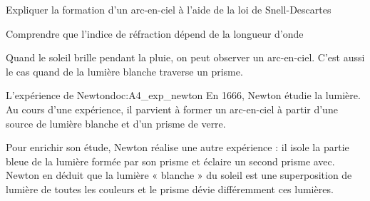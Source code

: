 \teteSndLumi
\vspace*{-40pt}



\vspace*{-12pt}
\begin{objectifs}
  \item Expliquer la formation d'un arc-en-ciel à l'aide de la loi de Snell-Descartes
  \item Comprendre que l'indice de réfraction dépend de la longueur d'onde
\end{objectifs}

\begin{contexte}
  Quand le soleil brille pendant la pluie, on peut observer un arc-en-ciel.
  C'est aussi le cas quand de la lumière blanche traverse un prisme.
  
\end{contexte}


\begin{doc}{L'expérience de Newton}{doc:A4_exp_newton}
  En 1666, Newton étudie la lumière.
  Au cours d'une expérience, il parvient à former un arc-en-ciel à partir d'une source de lumière blanche et d'un prisme de verre.
 
  Pour enrichir son étude, Newton réalise une autre expérience : il isole la partie bleue de la lumière formée par son prisme et éclaire un second prisme avec.
  Newton en déduit que la lumière « blanche » du soleil est une superposition de lumière de toutes les couleurs et le prisme dévie différemment ces lumières.
  
  \vspace*{-8pt}
  \begin{center}
  \end{center}
\end{doc}

